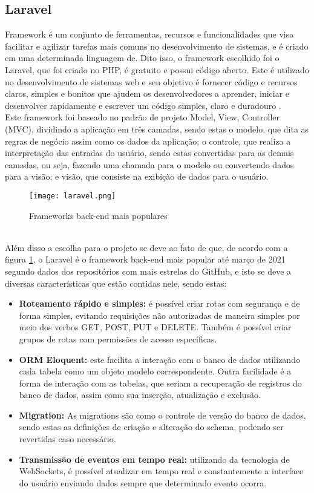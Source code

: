\subsection{Laravel}
Framework é um conjunto de ferramentas, recursos e funcionalidades que visa facilitar e agilizar tarefas mais comuns no desenvolvimento de sistemas, e é criado em uma determinada linguagem de. Dito isso, o framework escolhido foi o Laravel, que foi criado no PHP, é gratuito e possui código aberto. Este é utilizado no desenvolvimento de sistemas web e seu objetivo é fornecer código e recursos claros, simples e bonitos que ajudem os desenvolvedores a aprender, iniciar e desenvolver rapidamente e escrever um código simples, claro e duradouro \cite{STAUFFER}. \\
Este framework foi baseado no padrão de projeto Model, View, Controller (MVC), dividindo a aplicação em três camadas, sendo estas o modelo, que dita as regras de negócio assim como os dados da aplicação; o controle, que realiza a interpretação das entradas do usuário, sendo estas convertidas para as demais camadas, ou seja, fazendo uma chamada para o modelo ou convertendo dados para a visão; e visão, que consiste na exibição de dados para o usuário. \\
\begin{figure}[h]
    \caption{\label{framework_popular}Frameworks back-end mais populares}
    \vspace{5pt}
    \centering
    \texttt{[image: laravel.png]}
    \vspace{5pt}
\end{figure}\\
Além disso a escolha para o projeto se deve ao fato de que, de acordo com a figura \ref{framework_popular}, o Laravel é o framework back-end mais popular até março de 2021 segundo dados dos repositórios com mais estrelas do GitHub, e isto se deve a diversas características que estão contidas nele, sendo estas:
\begin{itemize}
    \item \textbf{Roteamento rápido e simples:} é possível criar rotas com segurança e de forma simples, evitando requisições não autorizadas de maneira simples por meio dos verbos GET, POST, PUT e DELETE. Também é possível criar grupos de rotas com permissões de acesso específicas.
    \item \textbf{ORM Eloquent:} este facilita a interação com o banco de dados utilizando cada tabela como um objeto modelo correspondente. Outra facilidade é a forma de interação com as tabelas, que seriam a recuperação de registros do banco de dados, assim como sua inserção, atualização e exclusão.
    \item \textbf{Migration:} As migrations são como o controle de versão do banco de dados, sendo estas as definições de criação e alteração do schema, podendo ser revertidas caso necessário.
    \item \textbf{Transmissão de eventos em tempo real:} utilizando da tecnologia de WebSockets, é possível atualizar em tempo real e constantemente a interface do usuário enviando dados sempre que determinado evento ocorra.
\end{itemize}
